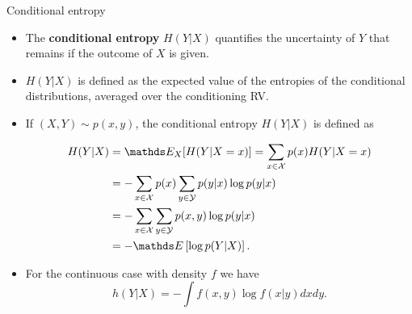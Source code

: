 \documentclass[11pt,compress,t,notes=noshow, xcolor=table]{beamer}
\begin{document}
\begin{vbframe}{Conditional entropy}
\begin{itemize}

\item The \textbf{conditional entropy} $H(Y|X)$ quantifies the uncertainty of $Y$ that remains if the outcome of $X$ is given.

\item $H(Y|X)$ is defined as the expected value of the entropies of the conditional distributions, averaged over the conditioning RV.
\item If $(X, Y) \sim p(x, y)$, the conditional entropy $H (Y|X)$ is defined as


\vspace{-0.2cm}
\footnotesize
\begin{equation*}\begin{aligned}
H(Y | X) &= \E_X[H(Y|X=x)] = \sum_{x \in \Xspace} p(x) H(Y | X=x) \\
&=-\sum_{x \in \Xspace} p(x) \sum_{y \in \Yspace} p(y | x) \log p(y | x) \\
&=-\sum_{x \in \Xspace} \sum_{y \in \Yspace} p(x, y) \log p(y | x) \\
&=-\E \left[\log p(Y | X) \right]. 
\end{aligned}\end{equation*}
\normalsize

\item For the continuous case with density $f$ we have $$h(Y|X) = - \int f(x,y) \log f(x|y) dx dy.$$
\end{itemize}

\end{vbframe}
\end{document}
